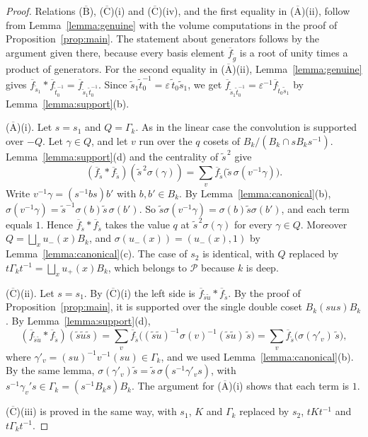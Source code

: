 \documentclass[12pt,letterpaper]{amsart}
\numberwithin{equation}{section}
\theoremstyle{definition}
\theoremstyle{remark}
\newcommand{\cP}{\mathcal{P}}
\newcommand{\fbar}{\overline{f}}
\begin{document}
\begin{proof}
Relations ($\overline{\mbox{B}}$), ($\overline{\mbox{C}}$)(i) and
($\overline{\mbox{C}}$)(iv), and the first equality in
($\overline{\mbox{A}}$)(ii), follow from Lemma~\ref{lemma:genuine}
with the volume computations in the proof of
Proposition~\ref{prop:main}. The statement about generators follows by
the argument given there, because every basis element
$\fbar_{\tilde g}$ is a root of unity times a product of generators.
For the second equality in ($\overline{\mbox{A}}$)(ii),
Lemma~\ref{lemma:genuine} gives $\fbar_{\tilde s_1}*\fbar_{\tilde
t_0^{-1}}=\fbar_{\tilde s_1\tilde t_0^{-1}}$. Since $\tilde s_1\tilde
t_0^{-1}=\varepsilon\,\tilde t_0\tilde s_1$, we get
$\fbar_{\tilde s_1\tilde t_0^{-1}}
=\varepsilon^{-1}\fbar_{\tilde t_0\tilde s_1}$ by
Lemma~\ref{lemma:support}(b).

($\overline{\mbox{A}}$)(i). Let $s=s_1$ and $Q=\Gamma_k$. As in the
linear case the convolution is supported over $-Q$. Let $\gamma\in Q$,
and let $v$ run over the $q$ cosets of $B_k/(B_k\cap sB_ks^{-1})$.
Lemma~\ref{lemma:support}(d) and the centrality of $\tilde s^{\,2}$
give
\[
(\fbar_{\tilde s}*\fbar_{\tilde s})(\tilde s^{\,2}\sigma(\gamma))
=\sum_v\fbar_{\tilde s}\bigl(\tilde s\,\sigma(v^{-1}\gamma)\bigr).
\]
Write $v^{-1}\gamma=(s^{-1}bs)b'$ with $b,b'\in B_k$. By
Lemma~\ref{lemma:canonical}(b),
$\sigma(v^{-1}\gamma)=\tilde s^{-1}\sigma(b)\tilde s\,\sigma(b')$. So
$\tilde s\sigma(v^{-1}\gamma)=\sigma(b)\tilde s\sigma(b')$, and each
term equals $1$. Hence $\fbar_{\tilde s}*\fbar_{\tilde s}$ takes the
value $q$ at $\tilde s^{\,2}\sigma(\gamma)$ for every $\gamma\in Q$.
Moreover $Q=\bigsqcup_xu_-(x)B_k$, and $\sigma(u_-(x))=(u_-(x),1)$ by
Lemma~\ref{lemma:canonical}(c). The case of $s_2$ is identical, with
$Q$ replaced by $t\Gamma_kt^{-1}=\bigsqcup_xu_+(x)B_k$, which belongs
to $\cP$ because $k$ is deep.

($\overline{\mbox{C}}$)(ii). Let $s=s_1$. By
($\overline{\mbox{C}}$)(i) the left side is
$\fbar_{\tilde s\tilde u}*\fbar_{\tilde s}$. By the proof of
Proposition~\ref{prop:main}, it is supported over the single double
coset $B_k(sus)B_k$. By Lemma~\ref{lemma:support}(d),
\[
(\fbar_{\tilde s\tilde u}*\fbar_{\tilde s})(\tilde s\tilde u\tilde s)
=\sum_v\fbar_{\tilde s}\bigl((\tilde s\tilde u)^{-1}
\sigma(v)^{-1}(\tilde s\tilde u)\,\tilde s\bigr)
=\sum_v\fbar_{\tilde s}\bigl(\sigma(\gamma'_v)\,\tilde s\bigr),
\]
where $\gamma'_v=(su)^{-1}v^{-1}(su)\in\Gamma_k$, and we used
Lemma~\ref{lemma:canonical}(b). By the same lemma,
$\sigma(\gamma'_v)\tilde s=\tilde s\,\sigma(s^{-1}\gamma'_vs)$, with
$s^{-1}\gamma_v's\in\Gamma_k=(s^{-1}B_ks)B_k$. The argument for
($\overline{\mbox{A}}$)(i) shows that each term is $1$.

($\overline{\mbox{C}}$)(iii) is proved in the same way, with $s_1$,
$K$ and $\Gamma_k$ replaced by $s_2$, $tKt^{-1}$ and $t\Gamma_kt^{-1}$.
\end{proof}
\end{document}
